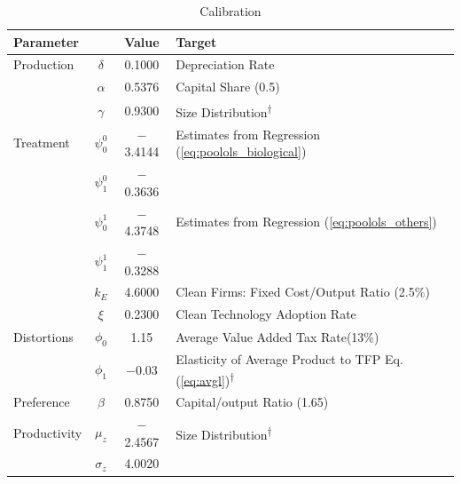 \documentclass[AEJ]{AEA}
\begin{document}
\begin{table}[t]
\footnotesize
\centering
\caption{Calibration}
\begin{tabular}{lccl}
    \hline \hline
    Parameter     &                   & Value         & Target                                                      \\
    \hline
    Production    & $\delta$          & 0.1000        & Depreciation Rate                                           \\
                  & $\alpha$          & 0.5376        & Capital Share (0.5)                                         \\
                  & $\gamma$          & 0.9300        & Size Distribution\textsuperscript{$\dagger$}                \\
    \hline
    Treatment     & $\psi_0^{0}$      & $-$3.4144     & Estimates from Regression (\ref{eq:poolols_biological})     \\
                  & $\psi_1^{0}$      & $-$0.3636     &                                                             \\
                  & $\psi_0^{1}$      & $-$4.3748     & Estimates from Regression (\ref{eq:poolols_others})         \\
                  & $\psi_1^{1}$      & $-$0.3288     &                                                             \\
                  & $k_E$             & 4.6000        & Clean Firms: Fixed Cost/Output Ratio (2.5\%)                \\
                  & $\xi$             & 0.2300        & Clean Technology Adoption Rate                              \\
    \hline
    Distortions   & $\phi_0$          & 1.15          & Average Value Added Tax Rate(13\%)                          \\
                  & $\phi_1$          & $-$0.03       & Elasticity of Average Product to TFP Eq. (\ref{eq:avgl})\textsuperscript{$\dagger$}    \\
    Preference    & $\beta$           & 0.8750        & Capital/output Ratio (1.65)                                 \\
    \hline
    Productivity  & $\mu_z$           & $-$2.4567     & Size Distribution\textsuperscript{$\dagger$}                \\
                  & $\sigma_z$        & 4.0020        &                                                             \\

\end{tabular}
\end{table}
\end{document}

